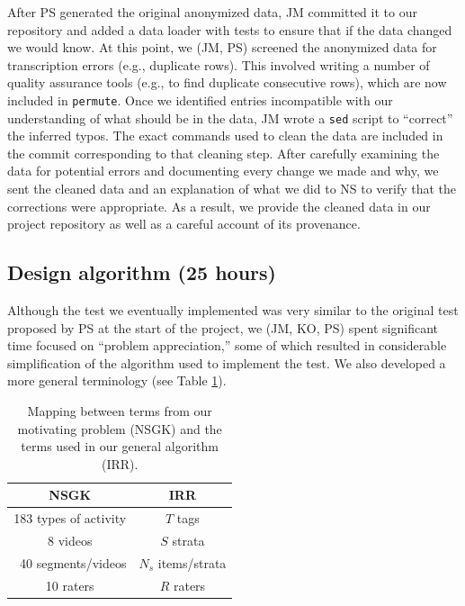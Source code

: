 \documentclass[]{article}
\begin{document}
After PS generated the original anonymized data, JM committed it to our
repository and added a data loader with tests to ensure that if the data
changed we would know.
At this point, we (JM, PS) screened the anonymized data for transcription
errors (e.g., duplicate rows).
This involved writing a number of quality assurance tools (e.g., to find
duplicate consecutive rows), which are now included in \texttt{permute}.
Once we identified entries incompatible with our understanding of what should
be in the data, JM wrote a \texttt{sed} script to ``correct'' the inferred
typos.
The exact commands used to clean the data are included in the commit
corresponding to that cleaning step.
After carefully examining the data for potential errors and documenting
every change we made and why, we sent the cleaned data and an explanation
of what we did to NS to verify that the corrections were appropriate.
As a result, we provide the cleaned data in our project repository as well
as a careful account of its provenance.

\subsection{Design algorithm (25 hours)}

Although the test we eventually implemented was very similar to the original test
proposed by PS at the start of the project, we (JM, KO, PS) spent significant
time focused on ``problem appreciation,'' some of which resulted in considerable
simplification of the algorithm used to implement the test.
We also developed a more general terminology (see Table \ref{table:mapping}).
\begin{table}[h]
\begin{center}
\begin{tabular}{ | c | c | }
  \hline
  \textbf{NSGK} & \textbf{IRR}  \\
  \hline
  183 types of activity  & $T$ tags  \\
  \hline
  8 videos  & $S$ strata   \\
  \hline
  ~40 segments/videos  & $N_s$ items/strata   \\
  \hline
  10 raters  & $R$ raters  \\
  \hline
\end{tabular}
\caption{Mapping between terms from our motivating problem (NSGK) and the terms
         used in our general algorithm (IRR).}\label{table:mapping}
\end{center}
\end{table}
\end{document}

